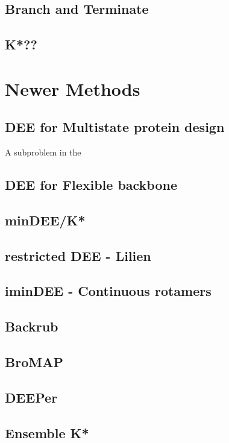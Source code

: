 \documentclass{article}
\begin{document}
\subsection{Branch and Terminate}

\subsection{K*??} 

\section{Newer Methods}

\subsection{DEE for Multistate protein design}
A subproblem in the 

\subsection{DEE for Flexible backbone}

\subsection{minDEE/K*}

\subsection{restricted DEE - Lilien}

\subsection{iminDEE - Continuous rotamers}

\subsection{Backrub}

\subsection{BroMAP}

\subsection{DEEPer}

\subsection{Ensemble K*}
\end{document}
